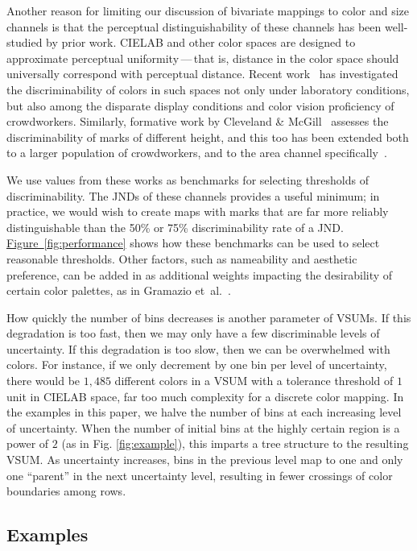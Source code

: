 \documentclass{vgtc}                          %
\newcommand{\figref}[1]{\hyperref[#1]{Figure~\ref*{#1}}}
\newcommand{\ea}{{et~al.}\xspace}
\begin{document}
Another reason for limiting our discussion of bivariate mappings to color and size channels is that the perceptual distinguishability of these channels has been well-studied by prior work. CIELAB and other color spaces are designed to approximate perceptual uniformity\,---\,that is, distance in the color space should universally correspond with perceptual distance. Recent work~\cite{stone2014engineering,szafir2014adapting} has investigated the discriminability of colors in such spaces not only under laboratory conditions, but also among the disparate display conditions and color vision proficiency of crowdworkers. Similarly, formative work by Cleveland \& McGill~\cite{cleveland1984graphical} assesses the discriminability of marks of different height, and this too has been extended both to a larger population of crowdworkers, and to the area channel specifically~\cite{heer2010crowdsourcing,talbot2014four}.

We use values from these works as benchmarks for selecting thresholds of discriminability. The JNDs of these channels provides a useful minimum; in practice, we would wish to create maps with marks that are far more reliably distinguishable than the 50\% or 75\% discriminability rate of a JND. \figref{fig:performance} shows how these benchmarks can be used to select reasonable thresholds. Other factors, such as nameability and aesthetic preference, can be added in as additional weights impacting the desirability of certain color palettes, as in Gramazio \ea~\cite{gramazio2017colorgorical}.

How quickly the number of bins decreases is another parameter of VSUMs. If this degradation is too fast, then we may only have a few discriminable levels of uncertainty. If this degradation is too slow, then we can be overwhelmed with colors. For instance, if we only decrement by one bin per level of uncertainty, there would be $1,485$ different colors in a VSUM with a tolerance threshold of $1$ unit in CIELAB space, far too much complexity for a discrete color mapping. In the examples in this paper, we halve the number of bins at each increasing level of uncertainty. When the number of initial bins at the highly certain region is a power of $2$ (as in Fig. \ref{fig:example}), this imparts a tree structure to the resulting VSUM. As uncertainty increases, bins in the previous level map to one and only one ``parent'' in the next uncertainty level, resulting in fewer crossings of color boundaries among rows.

\subsection{Examples}
\end{document}
